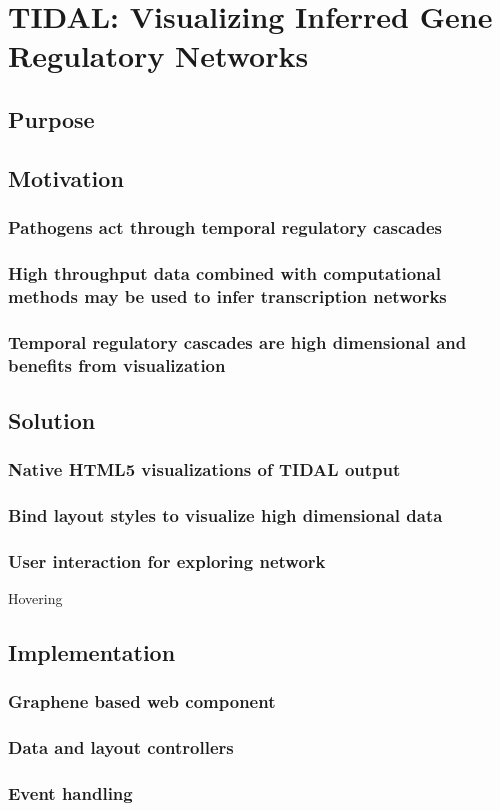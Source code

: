 \chapter{TIDAL: Visualizing Inferred Gene Regulatory Networks}

\section{Purpose}


\section{Motivation}
\subsection{Pathogens act through temporal regulatory cascades}
\subsection{High throughput data combined with computational methods may be used to infer transcription networks}
\autocite{zaslavsky2013reconstruction}
\subsection{Temporal regulatory cascades are high dimensional and benefits from visualization}


\section{Solution}
\subsection{Native HTML5 visualizations of TIDAL output}
\subsection{Bind layout styles to visualize high dimensional data}
\subsection{User interaction for exploring network}
Hovering

\section{Implementation}
\subsection{Graphene based web component}
\subsection{Data and layout controllers}
\subsection{Event handling}
